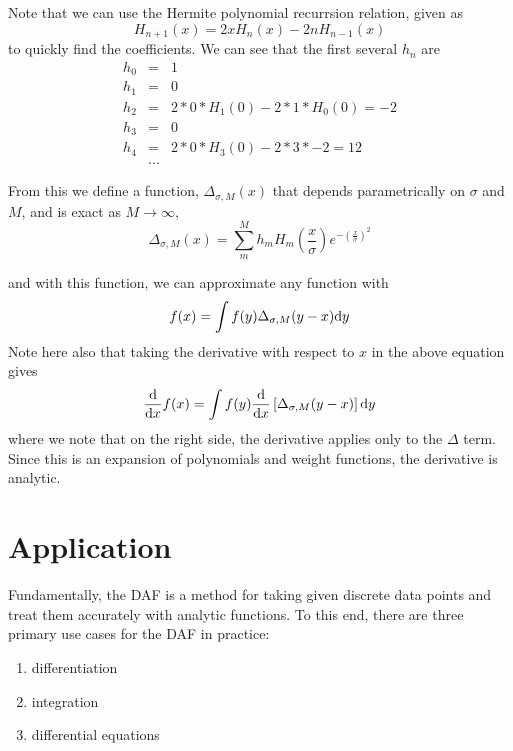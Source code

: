 \documentclass[preprint]{revtex4}
\begin{document}
Note that we can use the Hermite polynomial recurrsion relation, given as
\begin{equation}
\label{eqn_HermiteRecur}
H_{n+1}(x) = 2xH_n(x)-2nH_{n-1}(x)
\end{equation}
to quickly find the coefficients. We can see that the first several $h_n$  are
\begin{eqnarray}
h_0 & =&  1 \nonumber \\
h_1 &=& 0 \nonumber \\
h_2 &=& 2*0*H_1(0)-2*1*H_0(0) = -2 \nonumber \\
h_3 &=& 0 \nonumber \\
h_4 &=& 2*0*H_3(0) - 2*3*-2= 12 \nonumber \\
&...& \nonumber
\end{eqnarray}

From this we define a function, $\Delta_{\sigma,M}(x)$ that depends parametrically on
$\sigma$ and $M$, and is exact as $M\to\infty$, 
\begin{equation}
\label{eqn_DeltaExpansion}
\Delta_{\sigma,M}(x) = \sum_m^M h_m H_m \left(\frac{x}{\sigma}\right)e^{- \left(\frac{x}{\sigma}\right)^2}
\end{equation}

and with this function, we can approximate any function with
\begin{equation}
\label{eqn_f0delta_ident}
f(x) = \int f(y)\Delta_{\sigma,M}(y-x) {\rm d}y
\end{equation}
Note here also that taking the derivative with respect to $x$ in the above equation
gives
\begin{equation}
\label{eqn_f1delta_ident}
\frac{{\rm d}}{{\rm d}x}f(x) = 
    \int f(y) \frac{{\rm d}}{{\rm d}x}\left[\Delta_{\sigma,M}(y-x)\right] {\rm d}y
\end{equation}
where we note that on the right side, the derivative applies only to the $\Delta$ term. 
Since this is an expansion of polynomials and weight functions, the derivative is analytic. 



\section{Application}
Fundamentally, the DAF is a method for taking given discrete data points and treat them
accurately with analytic functions. To this end, there are three primary use cases for the
DAF in practice: 
\begin{enumerate}
\item differentiation
\item integration
\item differential equations
\end{enumerate}
\end{document}
